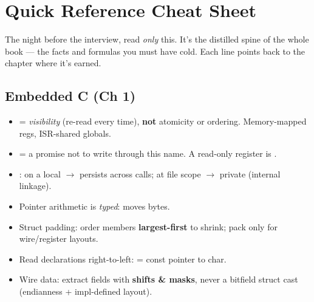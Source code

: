 \chapter{Quick Reference Cheat Sheet}
\label{ch:cheatsheet}

\begin{keyidea}
The night before the interview, read \emph{only} this. It's the distilled spine
of the whole book --- the facts and formulas you must have cold. Each line points
back to the chapter where it's earned.
\end{keyidea}

\section*{Embedded C (Ch 1)}
\begin{itemize}
\item {} = \emph{visibility} (re-read every time), \textbf{not}
  atomicity or ordering. Memory-mapped regs, ISR-shared globals.
\item {} = a promise not to write through this name. A read-only
  register is .
\item {}: on a local $\rightarrow$ persists across calls; at file
  scope $\rightarrow$ private (internal linkage).
\item Pointer arithmetic is \emph{typed}:  moves 
  bytes.
\item Struct padding: order members \textbf{largest-first} to shrink; pack only
  for wire/register layouts.
\item Read declarations right-to-left:  = const pointer to
  char.
\item Wire data: extract fields with \textbf{shifts \& masks}, never a bitfield
  struct cast (endianness + impl-defined layout).
\end{itemize}

